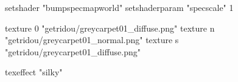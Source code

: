 setshader "bumpspecmapworld"
setshaderparam "specscale" 1

    texture 0 "getridou/greycarpet01_diffuse.png"
    texture n "getridou/greycarpet01_normal.png"
    texture s "getridou/greycarpet01_diffuse.png"

texeffect "silky"
